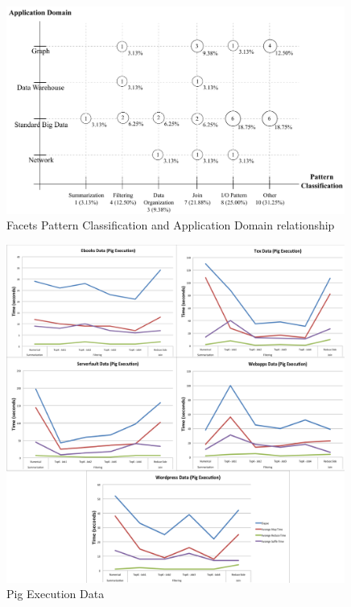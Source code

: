 \begin{figure}[hbtp]
\centering
\includegraphics[width=0.99\textwidth]{figs/Patterns-Domain.pdf}
\caption{Facets Pattern
Classification and Application Domain relationship}
\label{fig:patterns-domain}
\end{figure}
   
\begin{figure}[hbtp]
\centering
\includegraphics[width=0.99\textwidth]{figs/analysis-charts/compilation/pig.pdf}
\caption{Pig Execution Data}
\label{fig:patterns-domain}
\end{figure} 


